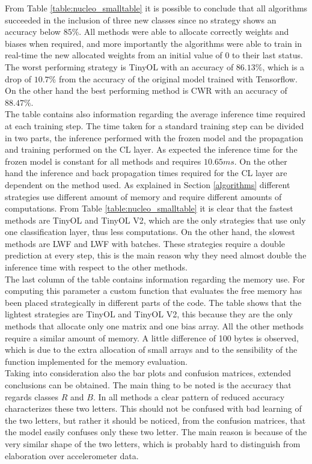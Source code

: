 \documentclass[12pt]{report}
\begin{document}
From Table \ref{table:nucleo_smalltable} it is possible to conclude that all algorithms succeeded in the inclusion of three new classes since no strategy shows an accuracy below $85 \%$. All methods were able to allocate correctly weights and biases when required, and more importantly the algorithms were able to train in real-time the new allocated weights from an initial value of 0 to their last status. The worst performing strategy is TinyOL with an accuracy of $86.13 \%$, which is a drop of $10.7 \%$ from the accuracy of the original model trained with Tensorflow. On the other hand the best performing method is CWR with an accuracy of $88.47 \%$.\\
The table contains also information regarding the average inference time required at each training step. The time taken for a standard training step can be divided in two parts, the inference performed with the frozen model and the propagation and training performed on the CL layer. As expected the inference time for the frozen model is constant for all methods and requires $10.65 ms$. On the other hand the inference and back propagation times required for the CL layer are dependent on the method used. As explained in Section \ref{algorithms} different strategies use different amount of memory and require different amounts of computations. From Table \ref{table:nucleo_smalltable} it is clear that the fastest methods are TinyOL and TinyOL V2, which are the only strategies that use only one classification layer, thus less computations. On the other hand, the slowest methods are LWF and LWF with batches. These strategies require a double prediction at every step, this is the main reason why they need almost double the inference time with respect to the other methods. \\
The last column of the table contains information regarding the memory use. For computing this parameter a custom function that evaluates the free memory has been placed strategically in different parts of the code. The table shows that the lightest strategies are TinyOL and TinyOL V2, this because they are the only methods that allocate only one matrix and one bias array. All the other methods require a similar amount of memory. A little difference of 100 bytes is observed, which is due to the extra allocation of small arrays and to the sensibility of the function implemented for the memory evaluation.\\
Taking into consideration also the bar plots and confusion matrices, extended conclusions can be obtained. The main thing to be noted is the accuracy that regards classes $R$ and $B$. In all methods a clear pattern of reduced accuracy characterizes these two letters. This should not be confused with bad learning of the two letters, but rather it should be noticed, from the confusion matrices, that the model easily confuses only these two letter. The main reason is because of the very similar shape of the two letters, which is probably hard to distinguish from elaboration over accelerometer data.\\ 
\end{document}
